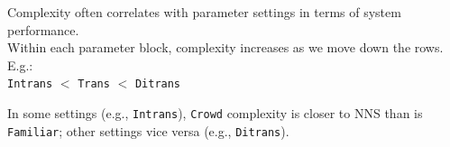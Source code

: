 \documentclass[handout,xcolor={dvipsnames}]{beamer}
\newcommand{\param}[1]{\texttt{#1}}
\begin{document}
\begin{frame}
\begin{columns}
\begin{column}{0.45\textwidth}  %

\pause
\vspace{-2em}

Complexity often correlates with parameter settings in terms of system performance. \\

\vspace{1em}
\pause
Within each parameter block, complexity increases as we move down the rows. E.g.: \\
\vspace{.5em}
\param{Intrans} $<$ \param{Trans} $<$ \param{Ditrans} \\
\vspace{1em}

\pause
In some settings (e.g., \param{Intrans}), \param{Crowd} complexity is closer to NNS than is \param{Familiar}; other settings vice versa (e.g., \param{Ditrans}). \\
 
\end{column}
\end{columns}

\end{frame}
\end{document}
